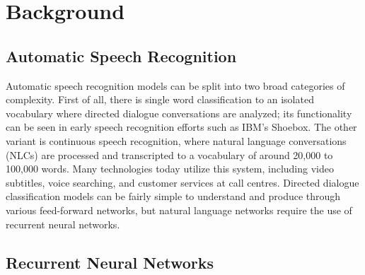 
\chapter{Background} %

\label{Background} %


\section{Automatic Speech Recognition}

Automatic speech recognition models can be split into two broad categories of complexity. First of all, there is single word classification to an isolated vocabulary where directed dialogue conversations are analyzed; its functionality can be seen in early speech recognition efforts such as IBM’s Shoebox. The other variant is continuous speech recognition, where natural language conversations (NLCs) are processed and transcripted to a vocabulary of around 20,000 to 100,000 words. Many technologies today utilize this system, including video subtitles, voice searching, and customer services at call centres. Directed dialogue classification models can be fairly simple to understand and produce through various feed-forward networks, but natural language networks require the use of recurrent neural networks.

\section{Recurrent Neural Networks}

